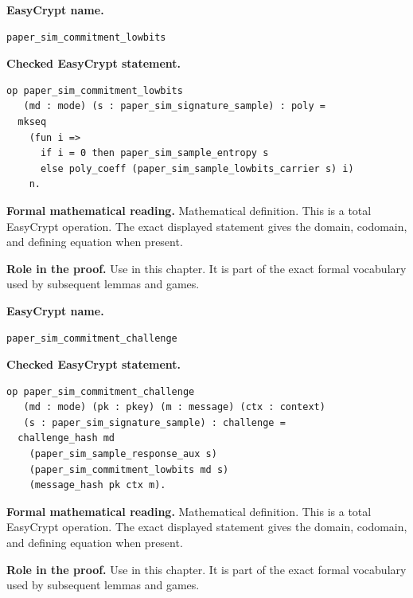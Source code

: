 \begin{formaldefinition}
\noindent\textbf{EasyCrypt name.}
\begin{lstlisting}[language=EasyCrypt,basicstyle=\ttfamily\scriptsize]
paper_sim_commitment_lowbits
\end{lstlisting}
\noindent\textbf{Checked EasyCrypt statement.}
\begin{lstlisting}[language=EasyCrypt,basicstyle=\ttfamily\scriptsize]
op paper_sim_commitment_lowbits
   (md : mode) (s : paper_sim_signature_sample) : poly =
  mkseq
    (fun i =>
      if i = 0 then paper_sim_sample_entropy s
      else poly_coeff (paper_sim_sample_lowbits_carrier s) i)
    n.
\end{lstlisting}
\noindent\textbf{Formal mathematical reading.}
Mathematical definition. This is a total EasyCrypt operation.  The exact displayed statement gives the domain, codomain, and defining equation when present.

\noindent\textbf{Role in the proof.}
Use in this chapter. It is part of the exact formal vocabulary used by subsequent lemmas and games.

\end{formaldefinition}

\begin{formaldefinition}
\noindent\textbf{EasyCrypt name.}
\begin{lstlisting}[language=EasyCrypt,basicstyle=\ttfamily\scriptsize]
paper_sim_commitment_challenge
\end{lstlisting}
\noindent\textbf{Checked EasyCrypt statement.}
\begin{lstlisting}[language=EasyCrypt,basicstyle=\ttfamily\scriptsize]
op paper_sim_commitment_challenge
   (md : mode) (pk : pkey) (m : message) (ctx : context)
   (s : paper_sim_signature_sample) : challenge =
  challenge_hash md
    (paper_sim_sample_response_aux s)
    (paper_sim_commitment_lowbits md s)
    (message_hash pk ctx m).
\end{lstlisting}
\noindent\textbf{Formal mathematical reading.}
Mathematical definition. This is a total EasyCrypt operation.  The exact displayed statement gives the domain, codomain, and defining equation when present.

\noindent\textbf{Role in the proof.}
Use in this chapter. It is part of the exact formal vocabulary used by subsequent lemmas and games.

\end{formaldefinition}


